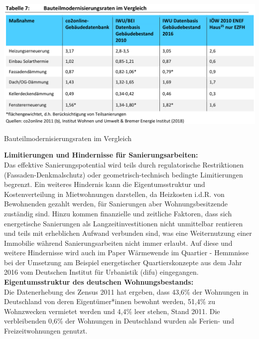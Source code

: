 				\begin{table}[h]
					\includegraphics[width=\linewidth]{Medien/tables/Tab_Umweltbundesamt_Bauteilmodernisierungsraten_Vgl_Wohnen_und_Sanieren_2019.png}
					\caption{Bauteilmodernisierungsraten im Vergleich \cite[S.~41]{Umweltbundesamt_Wohnen_und_Sanieren_2019}}
					\label{tab:Umweltbundesamt_Modernisierungsraten_Vgl}
				\end{table}
				
				\textbf{Limitierungen und Hindernisse für Sanierungsarbeiten:}\\
				Das effektive Sanierungspotential wird teils durch regulatorische Restriktionen (Fassaden-Denkmalschutz) oder geometrisch-technisch bedingte Limitierungen begrenzt. Ein weiteres Hindernis kann die Eigentumsstruktur und Kostenverteilung in Mietwohnungen darstellen, da Heizkosten i.d.R. von Bewohnenden gezahlt werden, für Sanierungen aber Wohnungsbesitzende zuständig sind. Hinzu kommen finanzielle und zeitliche Faktoren, dass sich energetische Sanierungen als Langzeitinvestitionen nicht unmittelbar rentieren und teils mit erheblichen Aufwand verbunden sind, was eine Weiternutzung einer Immobilie während Sanierungsarbeiten nicht immer erlaubt. Auf diese und weitere Hindernisse wird auch im Paper Wärmewende im Quartier - Hemmnisse bei der Umsetzung am Beispiel energetischer Quartierskonzepte aus dem Jahr 2016 vom Deutschen Institut für Urbanistik (difu) eingegangen. \cite{difu_2016_waermewende_im_quartier_hemmnisse}\\
				
				\textbf{Eigentumsstruktur des deutschen Wohnungsbestands:}\\
				Die Datenerhebung des Zensus 2011 hat ergeben, dass 43,6\% der Wohnungen in Deutschland von deren Eigentümer*innen bewohnt werden, 51,4\% zu Wohnzwecken vermietet werden und 4,4\% leer stehen, Stand 2011. Die verbleibenden 0,6\% der Wohnungen in Deutschland wurden als Ferien- und Freizeitwohnungen genutzt. \cite[S.~42ff]{Zensus_2011_Ergebnisse}\\
							
